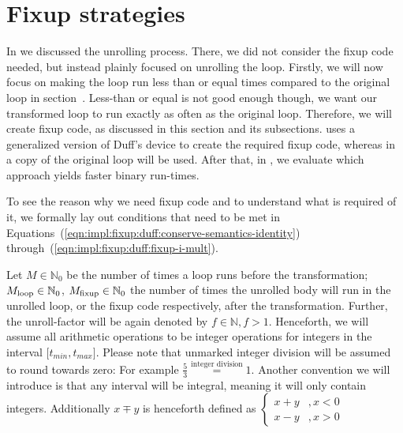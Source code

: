 





\newpage

\section{Fixup strategies}\label{sec:impl:fixup}

In  we discussed the unrolling process.
There, we did not consider the fixup code needed, but instead plainly focused on unrolling the loop.
Firstly, we will now focus on making the loop run less than or equal times compared to the original loop in section~.
Less-than or equal is not good enough though, we want our transformed loop to run exactly as often as the original loop.
Therefore, we will create fixup code, as discussed in this section and its subsections.
 uses a generalized version of Duff's device to create the required fixup code, whereas in  a copy of the original loop will be used.
After that, in , we evaluate which approach yields faster binary run-times.

To see the reason why we need fixup code and to understand what is required of it, we formally lay out conditions that need to be met in Equations~(\ref{eqn:impl:fixup:duff:conserve-semantics-identity}) through~(\ref{eqn:impl:fixup:duff:fixup-i-mult}).

Let $M \in \mathbb{N}_0$ be the number of times a loop runs before the transformation; $M_{\text{loop}} \in \mathbb{N}_0$, $M_{\text{fixup}} \in \mathbb{N}_0$ the number of times the unrolled body will run in the unrolled loop, or the fixup code respectively, after the transformation.
Further, the unroll-factor will be again denoted by $f \in \mathbb{N}, f > 1$.
Henceforth, we will assume all arithmetic operations to be integer operations for integers in the interval $\lbrack t_{min}, t_{max} \rbrack$.
Please note that unmarked integer division will be assumed to round towards zero: For example $\frac{5}{3} \overset{\text{integer division}}{=} 1$.
Another convention we will introduce is that any interval will be integral, meaning it will only contain integers.
Additionally $x \mp y$ is henceforth defined as
$\begin{cases}
     x + y &, x < 0\\
     x - y &, x > 0
\end{cases}$

